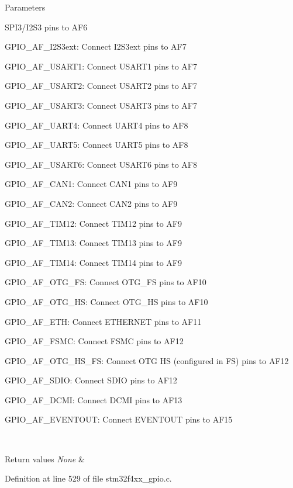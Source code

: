 \begin{DoxyParams}{Parameters}
\begin{DoxyItemize}
S\-P\-I3/\-I2\-S3 pins to A\-F6 \item G\-P\-I\-O\-\_\-\-A\-F\-\_\-\-I2\-S3ext\-: Connect I2\-S3ext pins to A\-F7 \item G\-P\-I\-O\-\_\-\-A\-F\-\_\-\-U\-S\-A\-R\-T1\-: Connect U\-S\-A\-R\-T1 pins to A\-F7 \item G\-P\-I\-O\-\_\-\-A\-F\-\_\-\-U\-S\-A\-R\-T2\-: Connect U\-S\-A\-R\-T2 pins to A\-F7 \item G\-P\-I\-O\-\_\-\-A\-F\-\_\-\-U\-S\-A\-R\-T3\-: Connect U\-S\-A\-R\-T3 pins to A\-F7 \item G\-P\-I\-O\-\_\-\-A\-F\-\_\-\-U\-A\-R\-T4\-: Connect U\-A\-R\-T4 pins to A\-F8 \item G\-P\-I\-O\-\_\-\-A\-F\-\_\-\-U\-A\-R\-T5\-: Connect U\-A\-R\-T5 pins to A\-F8 \item G\-P\-I\-O\-\_\-\-A\-F\-\_\-\-U\-S\-A\-R\-T6\-: Connect U\-S\-A\-R\-T6 pins to A\-F8 \item G\-P\-I\-O\-\_\-\-A\-F\-\_\-\-C\-A\-N1\-: Connect C\-A\-N1 pins to A\-F9 \item G\-P\-I\-O\-\_\-\-A\-F\-\_\-\-C\-A\-N2\-: Connect C\-A\-N2 pins to A\-F9 \item G\-P\-I\-O\-\_\-\-A\-F\-\_\-\-T\-I\-M12\-: Connect T\-I\-M12 pins to A\-F9 \item G\-P\-I\-O\-\_\-\-A\-F\-\_\-\-T\-I\-M13\-: Connect T\-I\-M13 pins to A\-F9 \item G\-P\-I\-O\-\_\-\-A\-F\-\_\-\-T\-I\-M14\-: Connect T\-I\-M14 pins to A\-F9 \item G\-P\-I\-O\-\_\-\-A\-F\-\_\-\-O\-T\-G\-\_\-\-F\-S\-: Connect O\-T\-G\-\_\-\-F\-S pins to A\-F10 \item G\-P\-I\-O\-\_\-\-A\-F\-\_\-\-O\-T\-G\-\_\-\-H\-S\-: Connect O\-T\-G\-\_\-\-H\-S pins to A\-F10 \item G\-P\-I\-O\-\_\-\-A\-F\-\_\-\-E\-T\-H\-: Connect E\-T\-H\-E\-R\-N\-E\-T pins to A\-F11 \item G\-P\-I\-O\-\_\-\-A\-F\-\_\-\-F\-S\-M\-C\-: Connect F\-S\-M\-C pins to A\-F12 \item G\-P\-I\-O\-\_\-\-A\-F\-\_\-\-O\-T\-G\-\_\-\-H\-S\-\_\-\-F\-S\-: Connect O\-T\-G H\-S (configured in F\-S) pins to A\-F12 \item G\-P\-I\-O\-\_\-\-A\-F\-\_\-\-S\-D\-I\-O\-: Connect S\-D\-I\-O pins to A\-F12 \item G\-P\-I\-O\-\_\-\-A\-F\-\_\-\-D\-C\-M\-I\-: Connect D\-C\-M\-I pins to A\-F13 \item G\-P\-I\-O\-\_\-\-A\-F\-\_\-\-E\-V\-E\-N\-T\-O\-U\-T\-: Connect E\-V\-E\-N\-T\-O\-U\-T pins to A\-F15 \end{DoxyItemize}
\\
\hline
\end{DoxyParams}

\begin{DoxyRetVals}{Return values}
{\em None} & \\
\hline
\end{DoxyRetVals}


Definition at line 529 of file stm32f4xx\-\_\-gpio.\-c.

